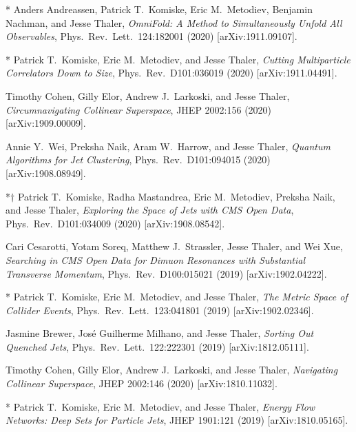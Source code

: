 \begin{list}{[]\addtocounter{jessecount}{-1}}{\leftmargin=3em \itemsep=4pt}
\item
* Anders Andreassen, Patrick T.\ Komiske, Eric M.\ Metodiev, Benjamin Nachman, and Jesse Thaler,
\emph{OmniFold: A Method to Simultaneously Unfold All Observables},
Phys.\ Rev.\ Lett.\ 124:182001 (2020)
[arXiv:1911.09107].

\item
* Patrick T.\ Komiske, Eric M.\ Metodiev, and Jesse Thaler,
\emph{Cutting Multiparticle Correlators Down to Size},
Phys.\ Rev.\ D101:036019 (2020)
[arXiv:1911.04491].

\item
 Timothy Cohen, Gilly Elor, Andrew J.\ Larkoski, and Jesse Thaler,
\emph{Circumnavigating Collinear Superspace},
JHEP 2002:156 (2020)
[arXiv:1909.00009].

\item
 Annie Y.\ Wei, Preksha Naik, Aram W.\ Harrow, and Jesse Thaler,
\emph{Quantum Algorithms for Jet Clustering},
Phys.\ Rev.\ D101:094015 (2020)
[arXiv:1908.08949].

\item
*$\dagger$ Patrick T.\ Komiske, Radha Mastandrea, Eric M.\ Metodiev, Preksha Naik, and Jesse Thaler,
\emph{Exploring the Space of Jets with CMS Open Data},
Phys.\ Rev.\ D101:034009 (2020)
[arXiv:1908.08542].

\item
 Cari Cesarotti, Yotam Soreq, Matthew J.\ Strassler, Jesse Thaler, and Wei Xue,
\emph{Searching in CMS Open Data for Dimuon Resonances with Substantial Transverse Momentum},
Phys.\ Rev.\ D100:015021 (2019)
[arXiv:1902.04222].

\item
* Patrick T.\ Komiske, Eric M.\ Metodiev, and Jesse Thaler,
\emph{The Metric Space of Collider Events},
Phys.\ Rev.\ Lett.\ 123:041801 (2019)
[arXiv:1902.02346].

\item
 Jasmine Brewer, José Guilherme Milhano, and Jesse Thaler,
\emph{Sorting Out Quenched Jets},
Phys.\ Rev.\ Lett.\ 122:222301 (2019)
[arXiv:1812.05111].

\item
 Timothy Cohen, Gilly Elor, Andrew J.\ Larkoski, and Jesse Thaler,
\emph{Navigating Collinear Superspace},
JHEP 2002:146 (2020)
[arXiv:1810.11032].

\item
* Patrick T.\ Komiske, Eric M.\ Metodiev, and Jesse Thaler,
\emph{Energy Flow Networks: Deep Sets for Particle Jets},
JHEP 1901:121 (2019)
[arXiv:1810.05165].


\end{list}
